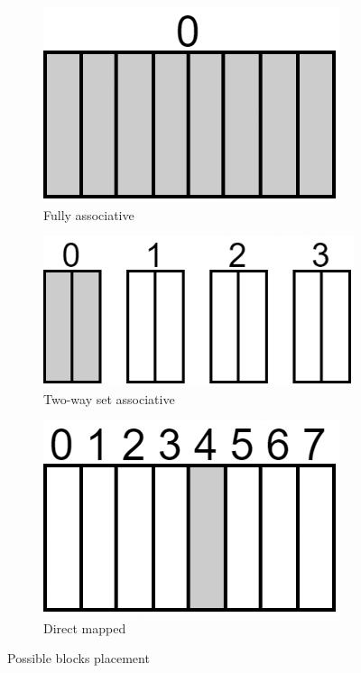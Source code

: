 \begin{figure}[H]
    \centering
    \begin{subfigure}{0.32\textwidth}
        \centering
        \includegraphics[width=0.45\linewidth]{images/fa.png} 
        \caption{Fully associative}
    \end{subfigure}
    \begin{subfigure}{0.32\textwidth}
        \centering
        \includegraphics[width=0.6\linewidth]{images/twsa.png}
        \caption{Two-way set associative}
    \end{subfigure}
    \begin{subfigure}{0.32\textwidth}
        \centering
        \includegraphics[width=0.45\linewidth]{images/dm.png}
        \caption{Direct mapped}
    \end{subfigure}
    \caption{Possible blocks placement}
\end{figure}

